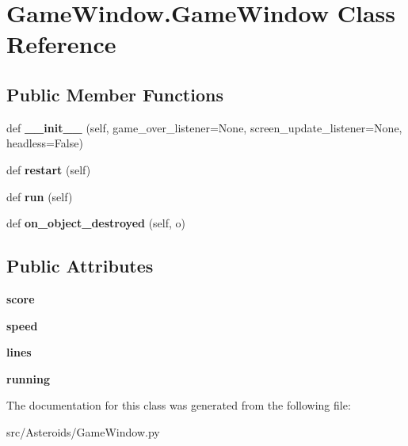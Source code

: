 \hypertarget{classGameWindow_1_1GameWindow}{}\section{Game\+Window.\+Game\+Window Class Reference}
\label{classGameWindow_1_1GameWindow}
\subsection*{Public Member Functions}
\begin{DoxyCompactItemize}
\item 
def {\bfseries \+\_\+\+\_\+init\+\_\+\+\_\+} (self, game\+\_\+over\+\_\+listener=None, screen\+\_\+update\+\_\+listener=None, headless=False)\hypertarget{classGameWindow_1_1GameWindow_a02010cc4371544b655369e6fd5794d71}{}\label{classGameWindow_1_1GameWindow_a02010cc4371544b655369e6fd5794d71}

\item 
def {\bfseries restart} (self)\hypertarget{classGameWindow_1_1GameWindow_a39325b3e2eb66949d2dd15e495fa6642}{}\label{classGameWindow_1_1GameWindow_a39325b3e2eb66949d2dd15e495fa6642}

\item 
def {\bfseries run} (self)\hypertarget{classGameWindow_1_1GameWindow_a87dc06fb2818940a4cf0d6318719e048}{}\label{classGameWindow_1_1GameWindow_a87dc06fb2818940a4cf0d6318719e048}

\item 
def {\bfseries on\+\_\+object\+\_\+destroyed} (self, o)\hypertarget{classGameWindow_1_1GameWindow_abf3b77ea8ac501d676eb86846da66835}{}\label{classGameWindow_1_1GameWindow_abf3b77ea8ac501d676eb86846da66835}

\end{DoxyCompactItemize}
\subsection*{Public Attributes}
\begin{DoxyCompactItemize}
\item 
{\bfseries score}\hypertarget{classGameWindow_1_1GameWindow_a1d84d147b6e32a9b135ebd2c25fa9de2}{}\label{classGameWindow_1_1GameWindow_a1d84d147b6e32a9b135ebd2c25fa9de2}

\item 
{\bfseries speed}\hypertarget{classGameWindow_1_1GameWindow_a65e5c68dfa1017d7d36c127dc91f7800}{}\label{classGameWindow_1_1GameWindow_a65e5c68dfa1017d7d36c127dc91f7800}

\item 
{\bfseries lines}\hypertarget{classGameWindow_1_1GameWindow_a5596975989f8091d3e6424c80eff1559}{}\label{classGameWindow_1_1GameWindow_a5596975989f8091d3e6424c80eff1559}

\item 
{\bfseries running}\hypertarget{classGameWindow_1_1GameWindow_a75c82f26a471a2bce7c30cc1ce450e85}{}\label{classGameWindow_1_1GameWindow_a75c82f26a471a2bce7c30cc1ce450e85}

\end{DoxyCompactItemize}


The documentation for this class was generated from the following file\+:\begin{DoxyCompactItemize}
\item 
src/\+Asteroids/Game\+Window.\+py\end{DoxyCompactItemize}
